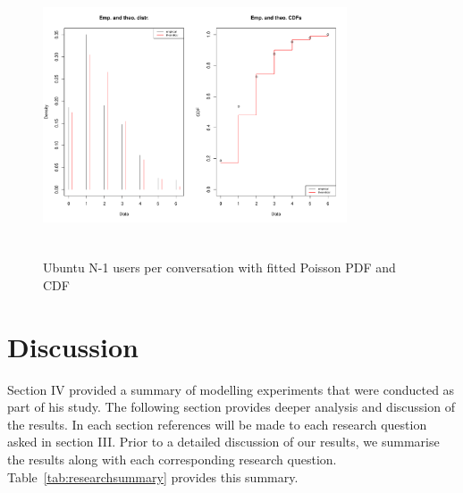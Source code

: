 \documentclass[conference]{IEEEtran}
\begin{document}
\begin{figure}
\begin{center}
\includegraphics[height=8.3cm, width=9cm]{16_users_ubuntu.pdf} 
\caption{Ubuntu N-1 users per conversation with fitted Poisson PDF and CDF}
\end{center}
\label{fig:interarrival_ent}
\end{figure}

\section{Discussion}

Section IV provided a summary of modelling experiments that were conducted as part of his study. The following section provides deeper analysis and discussion of the results. In each section references will be made to each research question asked in section III. Prior to a detailed discussion of our results, we summarise the results along with each corresponding research question. Table~\ref{tab:researchsummary} provides this summary.
\end{document}
